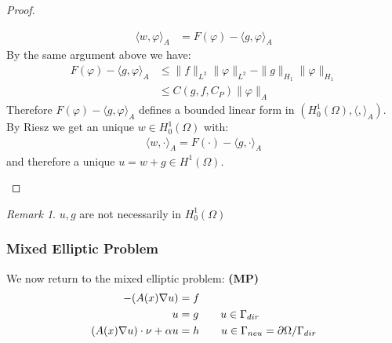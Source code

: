 \documentclass[a4paper,11pt,oneside,fleqn]{book}
\theoremstyle{definition}
\theoremstyle{remark}
\newtheorem*{remark}{Remark}
\let\div\relax
\DeclareMathOperator{\div}{div}
\begin{document}
\begin{proof}
\begin{enumerate}
\begin{align*}
		\langle w, \varphi \rangle_A &= F(\varphi) - \langle g , \varphi \rangle_A
	\end{align*}
	By the same argument above we have:
	\begin{align*}
		F(\varphi) - \langle g,  \varphi \rangle_A 
		&\leq \|f\|_{L^2} \|\varphi\|_{L^2} - \|g\|_{H_1} \|\varphi\|_{H_1} \\
		&\leq C(g, f, C_P)  \|\varphi\|_A
	\end{align*}
	Therefore $F(\varphi) - \langle g,  \varphi \rangle_A$ defines a bounded linear form in $(H^1_0(\Omega), \langle,\rangle_A)$. By Riesz we get an unique $w \in H^1_0(\Omega)$ with:
	\begin{align*}
		\langle w, \cdot \rangle_A = F(\cdot) - \langle g,  \cdot \rangle_A
	\end{align*} and therefore a unique $u = w + g \in H^1(\Omega) $.
\end{enumerate}
\end{proof}
\begin{remark}
$u, g$ are not necessarily in $H^1_0(\Omega)$	
\end{remark}







\subsubsection{Mixed Elliptic Problem}
We now return to the mixed elliptic problem: \textbf{(MP)}
\begin{equation}
\begin{aligned} \qquad
	-\div(A(x) \nabla u) &= f\\
	u &= g \qquad u \in \Gamma_{dir}\\
	(A(x)\nabla u)\cdot \nu + \alpha u &= h \qquad  u \in \Gamma_{neu} = \partial \Omega \slash \Gamma_{dir} 
\end{aligned}
\end{equation}
\end{document}
